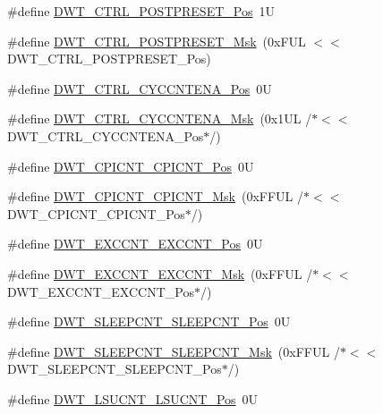\begin{DoxyCompactItemize}
\item 
\#define \hyperlink{group___c_m_s_i_s___d_w_t_ga129bc152febfddd67a0c20c6814cba69}{D\+W\+T\+\_\+\+C\+T\+R\+L\+\_\+\+P\+O\+S\+T\+P\+R\+E\+S\+E\+T\+\_\+\+Pos}~1U
\item 
\#define \hyperlink{group___c_m_s_i_s___d_w_t_ga11d9e1e2a758fdd2657aa68ce61b9c9d}{D\+W\+T\+\_\+\+C\+T\+R\+L\+\_\+\+P\+O\+S\+T\+P\+R\+E\+S\+E\+T\+\_\+\+Msk}~(0x\+F\+U\+L $<$$<$ D\+W\+T\+\_\+\+C\+T\+R\+L\+\_\+\+P\+O\+S\+T\+P\+R\+E\+S\+E\+T\+\_\+\+Pos)
\item 
\#define \hyperlink{group___c_m_s_i_s___d_w_t_gaa4509f5f8514a7200be61691f0e01f10}{D\+W\+T\+\_\+\+C\+T\+R\+L\+\_\+\+C\+Y\+C\+C\+N\+T\+E\+N\+A\+\_\+\+Pos}~0U
\item 
\#define \hyperlink{group___c_m_s_i_s___d_w_t_ga4a9d209dc2a81ea6bfa0ea21331769d3}{D\+W\+T\+\_\+\+C\+T\+R\+L\+\_\+\+C\+Y\+C\+C\+N\+T\+E\+N\+A\+\_\+\+Msk}~(0x1\+U\+L /$\ast$$<$$<$ D\+W\+T\+\_\+\+C\+T\+R\+L\+\_\+\+C\+Y\+C\+C\+N\+T\+E\+N\+A\+\_\+\+Pos$\ast$/)
\item 
\#define \hyperlink{group___c_m_s_i_s___d_w_t_ga80e9ad8f6a9e2344af8a3cf989bebe3d}{D\+W\+T\+\_\+\+C\+P\+I\+C\+N\+T\+\_\+\+C\+P\+I\+C\+N\+T\+\_\+\+Pos}~0U
\item 
\#define \hyperlink{group___c_m_s_i_s___d_w_t_ga76f39e7bca3fa86a4dbf7b8f6adb7217}{D\+W\+T\+\_\+\+C\+P\+I\+C\+N\+T\+\_\+\+C\+P\+I\+C\+N\+T\+\_\+\+Msk}~(0x\+F\+F\+U\+L /$\ast$$<$$<$ D\+W\+T\+\_\+\+C\+P\+I\+C\+N\+T\+\_\+\+C\+P\+I\+C\+N\+T\+\_\+\+Pos$\ast$/)
\item 
\#define \hyperlink{group___c_m_s_i_s___d_w_t_ga031c693654030d4cba398b45d2925b1d}{D\+W\+T\+\_\+\+E\+X\+C\+C\+N\+T\+\_\+\+E\+X\+C\+C\+N\+T\+\_\+\+Pos}~0U
\item 
\#define \hyperlink{group___c_m_s_i_s___d_w_t_ga057fa604a107b58a198bbbadb47e69c9}{D\+W\+T\+\_\+\+E\+X\+C\+C\+N\+T\+\_\+\+E\+X\+C\+C\+N\+T\+\_\+\+Msk}~(0x\+F\+F\+U\+L /$\ast$$<$$<$ D\+W\+T\+\_\+\+E\+X\+C\+C\+N\+T\+\_\+\+E\+X\+C\+C\+N\+T\+\_\+\+Pos$\ast$/)
\item 
\#define \hyperlink{group___c_m_s_i_s___d_w_t_ga0371a84a7996dc5852c56afb2676ba1c}{D\+W\+T\+\_\+\+S\+L\+E\+E\+P\+C\+N\+T\+\_\+\+S\+L\+E\+E\+P\+C\+N\+T\+\_\+\+Pos}~0U
\item 
\#define \hyperlink{group___c_m_s_i_s___d_w_t_ga1e340751d71413fef400a0a1d76cc828}{D\+W\+T\+\_\+\+S\+L\+E\+E\+P\+C\+N\+T\+\_\+\+S\+L\+E\+E\+P\+C\+N\+T\+\_\+\+Msk}~(0x\+F\+F\+U\+L /$\ast$$<$$<$ D\+W\+T\+\_\+\+S\+L\+E\+E\+P\+C\+N\+T\+\_\+\+S\+L\+E\+E\+P\+C\+N\+T\+\_\+\+Pos$\ast$/)
\item 
\#define \hyperlink{group___c_m_s_i_s___d_w_t_gab9394c7911b0b4312a096dad91d53a3d}{D\+W\+T\+\_\+\+L\+S\+U\+C\+N\+T\+\_\+\+L\+S\+U\+C\+N\+T\+\_\+\+Pos}~0U
$$
\end{DoxyCompactItemize}
